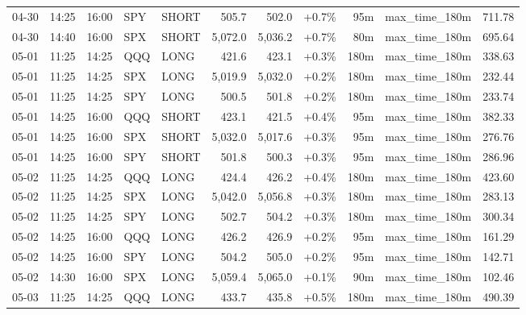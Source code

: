 \documentclass[11pt,a4paper,twoside]{article}
\begin{document}
\begin{center}
\begin{longtable}{>{\color{txtmain}}l l l l l r r r r >{\color{txtmain}}l r}
04-30 & 14:25 & 16:00 & SPY & SHORT & 505.7 & 502.0 & \textcolor{wingreen}{+0.7\%} & 95m & max\_time\_180m & \textcolor{wingreen}{711.78} \\
04-30 & 14:40 & 16:00 & SPX & SHORT & 5,072.0 & 5,036.2 & \textcolor{wingreen}{+0.7\%} & 80m & max\_time\_180m & \textcolor{wingreen}{695.64} \\
05-01 & 11:25 & 14:25 & QQQ & LONG & 421.6 & 423.1 & \textcolor{wingreen}{+0.3\%} & 180m & max\_time\_180m & \textcolor{wingreen}{338.63} \\
05-01 & 11:25 & 14:25 & SPX & LONG & 5,019.9 & 5,032.0 & \textcolor{wingreen}{+0.2\%} & 180m & max\_time\_180m & \textcolor{wingreen}{232.44} \\
05-01 & 11:25 & 14:25 & SPY & LONG & 500.5 & 501.8 & \textcolor{wingreen}{+0.2\%} & 180m & max\_time\_180m & \textcolor{wingreen}{233.74} \\
05-01 & 14:25 & 16:00 & QQQ & SHORT & 423.1 & 421.5 & \textcolor{wingreen}{+0.4\%} & 95m & max\_time\_180m & \textcolor{wingreen}{382.33} \\
05-01 & 14:25 & 16:00 & SPX & SHORT & 5,032.0 & 5,017.6 & \textcolor{wingreen}{+0.3\%} & 95m & max\_time\_180m & \textcolor{wingreen}{276.76} \\
05-01 & 14:25 & 16:00 & SPY & SHORT & 501.8 & 500.3 & \textcolor{wingreen}{+0.3\%} & 95m & max\_time\_180m & \textcolor{wingreen}{286.96} \\
05-02 & 11:25 & 14:25 & QQQ & LONG & 424.4 & 426.2 & \textcolor{wingreen}{+0.4\%} & 180m & max\_time\_180m & \textcolor{wingreen}{423.60} \\
05-02 & 11:25 & 14:25 & SPX & LONG & 5,042.0 & 5,056.8 & \textcolor{wingreen}{+0.3\%} & 180m & max\_time\_180m & \textcolor{wingreen}{283.13} \\
05-02 & 11:25 & 14:25 & SPY & LONG & 502.7 & 504.2 & \textcolor{wingreen}{+0.3\%} & 180m & max\_time\_180m & \textcolor{wingreen}{300.34} \\
05-02 & 14:25 & 16:00 & QQQ & LONG & 426.2 & 426.9 & \textcolor{wingreen}{+0.2\%} & 95m & max\_time\_180m & \textcolor{wingreen}{161.29} \\
05-02 & 14:25 & 16:00 & SPY & LONG & 504.2 & 505.0 & \textcolor{wingreen}{+0.2\%} & 95m & max\_time\_180m & \textcolor{wingreen}{142.71} \\
05-02 & 14:30 & 16:00 & SPX & LONG & 5,059.4 & 5,065.0 & \textcolor{wingreen}{+0.1\%} & 90m & max\_time\_180m & \textcolor{wingreen}{102.46} \\
05-03 & 11:25 & 14:25 & QQQ & LONG & 433.7 & 435.8 & \textcolor{wingreen}{+0.5\%} & 180m & max\_time\_180m & \textcolor{wingreen}{490.39} \\

\end{longtable}
\end{center}
\end{document}
